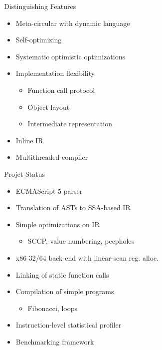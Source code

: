 \begin{frame}{Distinguishing Features}
    \begin{itemize}
        \item Meta-circular with dynamic language
        \item Self-optimizing
        \item Systematic optimistic optimizations
        \item Implementation flexibility
        \begin{itemize}
            \item Function call protocol
            \item Object layout
            \item Intermediate representation
        \end{itemize}
        \item Inline IR
        \item Multithreaded compiler
    \end{itemize}
\end{frame}

\begin{frame}{Projet Status}
    \begin{itemize}
        \item ECMAScript 5 parser
        \item Translation of ASTs to SSA-based IR
        \item Simple optimizations on IR
        \begin{itemize}
            \item SCCP, value numbering, peepholes
        \end{itemize}
        \item x86 32/64 back-end with linear-scan reg. alloc.
        \item Linking of static function calls
        \item Compilation of simple programs
        \begin{itemize}
            \item Fibonacci, loops
        \end{itemize}
        \item Instruction-level statistical profiler
        \item Benchmarking framework
    \end{itemize}
\end{frame}


